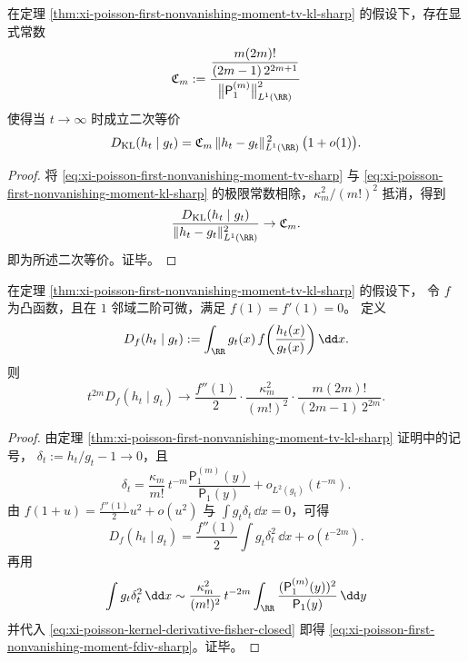 \begin{corollary}\label{cor:xi-poisson-kl-l1-square-equivalence-first-moment}
在定理 \ref{thm:xi-poisson-first-nonvanishing-moment-tv-kl-sharp} 的假设下，存在显式常数
\[
\mathfrak C_m
:=
\frac{\displaystyle\frac{m(2m)!}{(2m-1)\,2^{2m+1}}}
{\bigl\|\mathsf P_1^{(m)}\bigr\|_{L^1(\RR)}^2}
\]
使得当 \(t\to\infty\) 时成立二次等价
\[
D_{\mathrm{KL}}(h_t\mid g_t)
=\mathfrak C_m\,\|h_t-g_t\|_{L^1(\RR)}^{\,2}\,\bigl(1+o(1)\bigr).
\]
\end{corollary}
\begin{proof}
将 \eqref{eq:xi-poisson-first-nonvanishing-moment-tv-sharp} 与
\eqref{eq:xi-poisson-first-nonvanishing-moment-kl-sharp} 的极限常数相除，\(\kappa_m^2/(m!)^2\) 抵消，得到
\[
\frac{D_{\mathrm{KL}}(h_t\mid g_t)}{\|h_t-g_t\|_{L^1(\RR)}^2}\to \mathfrak C_m.
\]
即为所述二次等价。证毕。
\end{proof}

\begin{proposition}\label{prop:xi-poisson-first-nonvanishing-moment-fdiv-sharp}
在定理 \ref{thm:xi-poisson-first-nonvanishing-moment-tv-kl-sharp} 的假设下，
令 \(f\) 为凸函数，且在 \(1\) 邻域二阶可微，满足
\(
f(1)=f'(1)=0
\)。
定义
\[
D_f(h_t\mid g_t):=\int_{\RR}g_t(x)\,
f\!\left(\frac{h_t(x)}{g_t(x)}\right)\dd x.
\]
则
\begin{equation}\label{eq:xi-poisson-first-nonvanishing-moment-fdiv-sharp}
t^{2m}D_f(h_t\mid g_t)
\longrightarrow
\frac{f''(1)}{2}\cdot\frac{\kappa_m^2}{(m!)^2}\cdot
\frac{m(2m)!}{(2m-1)\,2^{2m}}.
\end{equation}
\end{proposition}
\begin{proof}
由定理 \ref{thm:xi-poisson-first-nonvanishing-moment-tv-kl-sharp} 证明中的记号，
\(\delta_t:=h_t/g_t-1\to 0\)，且
\[
\delta_t
=\frac{\kappa_m}{m!}\,t^{-m}\frac{\mathsf P_1^{(m)}(y)}{\mathsf P_1(y)}
+o_{L^2(g_t)}(t^{-m}).
\]
由
\(
f(1+u)=\frac{f''(1)}2u^2+o(u^2)
\)
与 \(\int g_t\delta_t\,\dd x=0\)，可得
\[
D_f(h_t\mid g_t)
=\frac{f''(1)}2\int g_t\delta_t^2\,\dd x+o(t^{-2m}).
\]
再用
\[
\int g_t\delta_t^2\,\dd x
\sim
\frac{\kappa_m^2}{(m!)^2}\,t^{-2m}
\int_{\RR}\frac{(\mathsf P_1^{(m)}(y))^2}{\mathsf P_1(y)}\,\dd y
\]
并代入 \eqref{eq:xi-poisson-kernel-derivative-fisher-closed} 即得
\eqref{eq:xi-poisson-first-nonvanishing-moment-fdiv-sharp}。证毕。
\end{proof}

